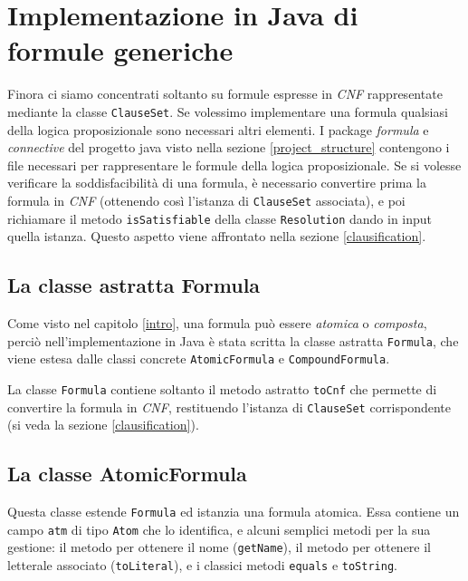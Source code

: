 \documentclass[a4paper,12pt]{report}
\begin{document}
% 
% 
\chapter{Implementazione in Java di formule generiche}
\label{formulas}
Finora ci siamo concentrati soltanto su formule espresse in \emph{CNF} rappresentate mediante la classe \texttt{ClauseSet}. Se volessimo implementare una formula qualsiasi della logica proposizionale sono necessari altri elementi. I package \emph{formula} e \emph{connective} del progetto java visto nella sezione \ref{project_structure} contengono i file necessari per rappresentare le formule della logica proposizionale. Se si volesse verificare la soddisfacibilità di una formula, è necessario convertire prima la formula in \emph{CNF} (ottenendo così l'istanza di \texttt{ClauseSet} associata), e poi richiamare il metodo \texttt{isSatisfiable} della classe \texttt{Resolution} dando in input quella istanza. Questo aspetto viene affrontato nella sezione \ref{clausification}.

\section{La classe astratta Formula}
Come visto nel capitolo \ref{intro}, una formula può essere \emph{atomica} o \emph{composta}, perciò nell'implementazione in Java è stata scritta la classe astratta \texttt{Formula}, che viene estesa dalle classi concrete \texttt{AtomicFormula} e \texttt{CompoundFormula}.

La classe \texttt{Formula} contiene soltanto il metodo astratto \texttt{toCnf} che permette di convertire la formula in \emph{CNF}, restituendo l'istanza di \texttt{ClauseSet} corrispondente (si veda la sezione \ref{clausification}).

\section{La classe AtomicFormula}
Questa classe estende \texttt{Formula} ed istanzia una formula atomica. Essa contiene un campo \texttt{atm} di tipo \texttt{Atom} che lo identifica, e alcuni semplici metodi per la sua gestione: il metodo per ottenere il nome (\texttt{getName}), il metodo per ottenere il letterale associato (\texttt{toLiteral}), e i classici metodi \texttt{equals} e \texttt{toString}.
\end{document}
